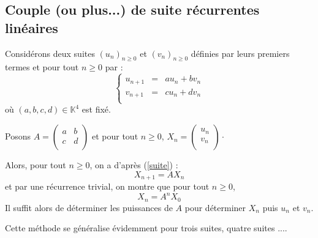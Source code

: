 \documentclass[french,11pt,twoside]{VcCours}
\begin{document}
\subsection{Couple (ou plus...) de suite récurrentes linéaires}
Considérons deux suites $(u_n)_{n \geq 0}$ et $(v_n)_{n \geq 0}$ définies par leurs premiers termes et pour tout $n \geq 0$ par :
\begin{equation}\label{suite}
 \left\lbrace \begin{array}{ccl}
u_{n+1} & = & a u_n + b v_n \\
v_{n+1} & = & c u_n + dv_n \\
\end{array}\right.
\end{equation}
où $(a,b,c,d) \in \mathbb{K}^4$ est fixé. 


Posons $A = \begin{pmatrix}
a & b \\
c & d \\
\end{pmatrix}$ et pour tout $n \geq 0$, $X_n = \begin{pmatrix}
u_n \\
v_n \\
\end{pmatrix} \cdot$


Alors, pour tout $n \geq 0$, on a d'après (\ref{suite}) :
$$ X_{n+1}=A X_n$$
et par une récurrence trivial, on montre que pour tout $n \geq 0$,
$$ X_n = A^n X_0$$
Il suffit alors de déterminer les puissances de $A$ pour déterminer $X_n$ puis $u_n$ et $v_n$.


Cette méthode se généralise évidemment pour trois suites, quatre suites ....
\end{document}
